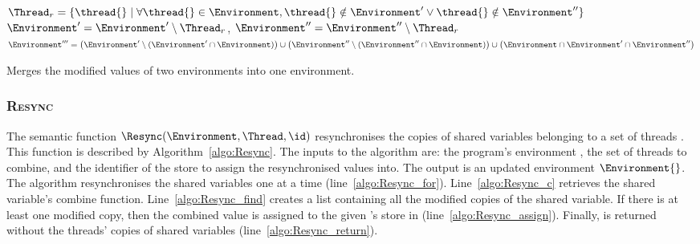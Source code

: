 \begin{algorithm}[t]
	\begin{algorithmic}[1]
			\State $\Thread_r = \lbrace \thread{} \mid \forall \thread{} \in \Environment, \thread{} \notin \Environment' \vee \thread{} \notin \Environment'' \rbrace$	\label{algo:Merge_remove1}
			\State $\Environment' = \Environment' \setminus \Thread_r$, $\Environment'' = \Environment'' \setminus \Thread_r$						\label{algo:Merge_remove2}
			\State \Return $\Environment''' = \left ( \Environment' \setminus (\Environment' \cap \Environment) \right ) \cup \left ( \Environment'' \setminus (\Environment'' \cap \Environment) \right ) \cup \left ( \Environment \cap \Environment' \cap \Environment'' \right )$	\label{algo:Merge_merge}
		\EndFunction
	\end{algorithmic}
	
	\caption{Merges the modified values of two environments into one environment.}
	\label{algo:Merge}
\end{algorithm}

\subsubsection{\textsc{Resync}}
\label{sec:forec_Resync}
The semantic function $\Resync(\Environment, \Thread, \id)$ resynchronises 
the copies of shared variables belonging to a set of threads \Thread{}. This 
function is described by Algorithm~\ref{algo:Resync}. The inputs to the 
algorithm are: the program's environment \Environment{}, the set of threads 
\Thread{} to combine, and the identifier \id{} of the store to assign the 
resynchronised values into. The output is an updated environment $\Environment{}$.
The algorithm resynchronises the shared variables one at a time (line~\ref{algo:Resync_for}).
Line~\ref{algo:Resync_c} retrieves the shared variable's 
combine function. Line~\ref{algo:Resync_find} creates a list containing all the modified copies 
of the shared variable. If there is at least one modified copy, 
then the combined value is assigned to the given \id{}'s store in \Environment{} 
(line~\ref{algo:Resync_assign}). 
Finally, \Environment{} is returned without the threads' copies of shared variables 
(line~\ref{algo:Resync_return}).

